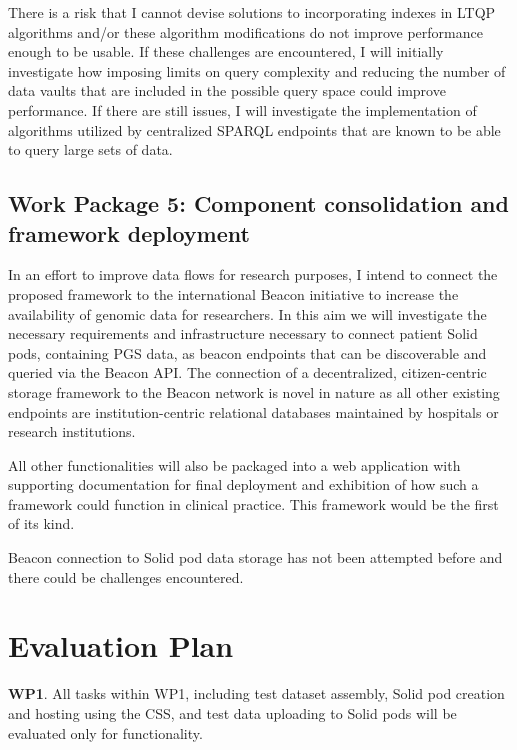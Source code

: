 \documentclass[runningheads]{llncs}
\begin{document}
There is a risk that I cannot devise solutions to incorporating indexes in LTQP algorithms and/or these algorithm modifications do not improve performance enough to be usable.
If these challenges are encountered, I will initially investigate how imposing limits on query complexity and reducing the number of data vaults that are included in the possible query space could improve performance.
If there are still issues, I will investigate the implementation of algorithms utilized by centralized SPARQL endpoints that are known to be able to query large sets of data. 


\subsection{Work Package 5: Component consolidation and framework deployment}

In an effort to improve data flows for research purposes, I intend to connect the proposed framework to the international Beacon initiative \cite{rambla_beacon_2022} to increase the availability of genomic data for researchers. 
In this aim we will investigate the necessary requirements and infrastructure necessary to connect patient Solid pods, containing PGS data, as beacon endpoints that can be discoverable and queried via the Beacon API. 
The connection of a decentralized, citizen-centric storage framework to the Beacon network is novel in nature as all other existing endpoints are institution-centric relational databases maintained by hospitals or research institutions.

All other functionalities will also be packaged into a web application with supporting documentation for final deployment and exhibition of how such a framework could function in clinical practice.
This framework would be the first of its kind.

Beacon connection to Solid pod data storage has not been attempted before and there could be challenges encountered.


\section{Evaluation Plan}

\textbf{WP1}.
All tasks within WP1, including test dataset assembly, Solid pod creation and hosting using the CSS, and test data uploading to Solid pods will be evaluated only for functionality.
\end{document}
